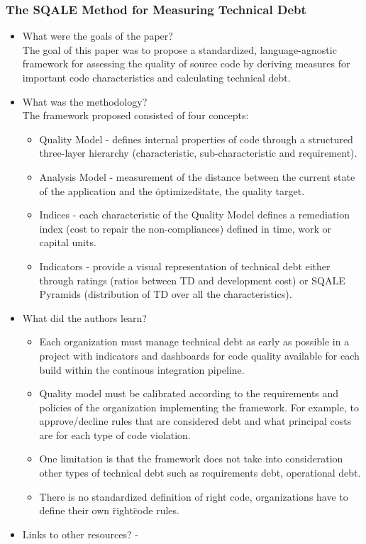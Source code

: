\documentclass{mprop}
\begin{document}
\subsubsection{The SQALE Method for Measuring Technical Debt} \cite{Letouzey2012}

\begin{itemize}
	\item What were the goals of the paper? \\
		The goal of this paper was to propose a standardized, language-agnostic framework for assessing the quality of source code by deriving measures for important code characteristics and calculating technical debt.
	\item What was the methodology? \\
		The framework proposed consisted of four concepts:
		\begin{itemize}
			\item Quality Model - defines internal properties of code through a structured three-layer hierarchy (characteristic, sub-characteristic and requirement).
			\item Analysis Model - measurement of the distance between the current state of the application and the \"optimized\" state, the quality target.
			\item Indices - each characteristic of the Quality Model defines a remediation index (cost to repair the non-compliances) defined in time, work or capital units.
			\item Indicators - provide a visual representation of technical debt either through ratings (ratios between TD and development cost) or SQALE Pyramids (distribution of TD over all the characteristics).
		\end{itemize}
	\item What did the authors learn?
		\begin{itemize}
			\item Each organization must manage technical debt as early as possible in a project with indicators and dashboards for code quality available for each build within the continous integration pipeline.
			\item Quality model must be calibrated according to the requirements and policies of the organization implementing the framework. For example, to approve/decline rules that are considered debt and what principal costs are for each type of code violation.
			\item One limitation is that the framework does not take into consideration other types of technical debt such as requirements debt, operational debt.
			\item There is no standardized definition of right code, organizations have to define their own \"right\" code rules.
		\end{itemize}
	\item Links to other resources?
		-
\end{itemize}
\end{document}
